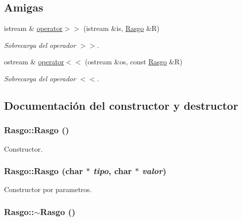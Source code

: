 \subsection*{Amigas}
\begin{CompactItemize}
\item 
istream \& \hyperlink{class_rasgo_9b71675e73bfbb2fd72fd8fcfe3ea656}{operator$>$$>$} (istream \&is, \hyperlink{class_rasgo}{Rasgo} \&R)
\begin{CompactList}\small\item\em Sobrecarga del operador $>$$>$. \item\end{CompactList}\item 
ostream \& \hyperlink{class_rasgo_af9fbba2f1a84943d6b21d1c46339b57}{operator$<$$<$} (ostream \&os, const \hyperlink{class_rasgo}{Rasgo} \&R)
\begin{CompactList}\small\item\em Sobrecarga del operador $<$$<$. \item\end{CompactList}\end{CompactItemize}


\subsection{Documentación del constructor y destructor}
\hypertarget{class_rasgo_4113ea8cb35ce2c98ff24ee733257438}{
\subsubsection[{Rasgo}]{\setlength{\rightskip}{0pt plus 5cm}Rasgo::Rasgo ()}}
\label{class_rasgo_4113ea8cb35ce2c98ff24ee733257438}


Constructor. 

\hypertarget{class_rasgo_a0b24a30e81c82a837eec32d2b0fdb5c}{
\subsubsection[{Rasgo}]{\setlength{\rightskip}{0pt plus 5cm}Rasgo::Rasgo (char $\ast$ {\em tipo}, \/  char $\ast$ {\em valor})}}
\label{class_rasgo_a0b24a30e81c82a837eec32d2b0fdb5c}


Constructor por parametros. 

\hypertarget{class_rasgo_2371a4d82578769c926682d8a6b44414}{
\subsubsection[{$\sim$Rasgo}]{\setlength{\rightskip}{0pt plus 5cm}Rasgo::$\sim$Rasgo ()}}
\label{class_rasgo_2371a4d82578769c926682d8a6b44414}


